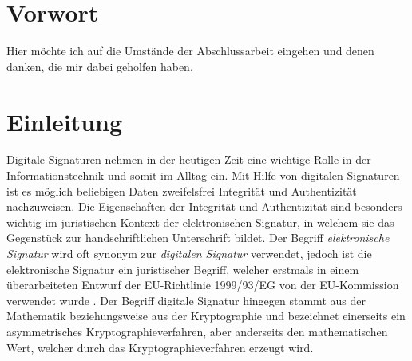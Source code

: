\documentclass[11pt,a4paper,ngerman]{scrreprt}
\begin{document}
\maketitle



\chapter*{Vorwort}
Hier möchte ich auf die Umstände der Abschlussarbeit eingehen und denen danken, die mir dabei geholfen haben.
\clearpage

\tableofcontents
\clearpage


\chapter{Einleitung}
Digitale Signaturen nehmen in der heutigen Zeit eine wichtige Rolle in der Informationstechnik und somit im Alltag ein. Mit Hilfe von digitalen Signaturen ist es möglich beliebigen Daten zweifelsfrei Integrität und Authentizität nachzuweisen. Die Eigenschaften der Integrität und Authentizität sind besonders wichtig im juristischen Kontext der elektronischen Signatur, in welchem sie das Gegenstück zur handschriftlichen Unterschrift bildet. Der Begriff \emph{elektronische Signatur} wird oft synonym zur \emph{digitalen Signatur} verwendet, jedoch ist die elektronische Signatur ein juristischer Begriff, welcher erstmals in einem überarbeiteten Entwurf der EU-Richtlinie 1999/93/EG von der EU-Kommission verwendet wurde \cite{eSigEU99}. Der Begriff digitale Signatur hingegen stammt aus der Mathematik beziehungsweise aus der Kryptographie und bezeichnet einerseits ein asymmetrisches Kryptographieverfahren, aber anderseits den mathematischen Wert, welcher durch das Kryptographieverfahren erzeugt wird.
\end{document}

